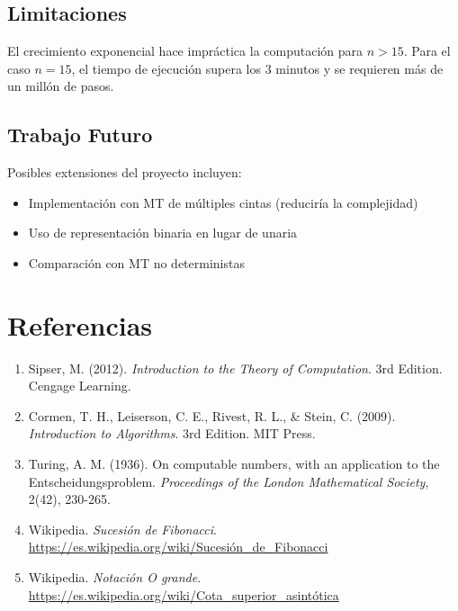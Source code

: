 \documentclass[12pt,a4paper]{article}
\begin{document}
\subsection{Limitaciones}

El crecimiento exponencial hace impráctica la computación para $n > 15$. Para el caso $n=15$, el tiempo de ejecución supera los 3 minutos y se requieren más de un millón de pasos.

\subsection{Trabajo Futuro}

Posibles extensiones del proyecto incluyen:
\begin{itemize}
    \item Implementación con MT de múltiples cintas (reduciría la complejidad)
    \item Uso de representación binaria en lugar de unaria
    \item Comparación con MT no deterministas
\end{itemize}

\newpage

\section*{Referencias}

\begin{enumerate}
    \item Sipser, M. (2012). \textit{Introduction to the Theory of Computation}. 3rd Edition. Cengage Learning.
    
    \item Cormen, T. H., Leiserson, C. E., Rivest, R. L., \& Stein, C. (2009). \textit{Introduction to Algorithms}. 3rd Edition. MIT Press.
    
    \item Turing, A. M. (1936). On computable numbers, with an application to the Entscheidungsproblem. \textit{Proceedings of the London Mathematical Society}, 2(42), 230-265.
    
    \item Wikipedia. \textit{Sucesión de Fibonacci}. \url{https://es.wikipedia.org/wiki/Sucesión_de_Fibonacci}
    
    \item Wikipedia. \textit{Notación O grande}. \url{https://es.wikipedia.org/wiki/Cota_superior_asintótica}
\end{enumerate}
\end{document}
